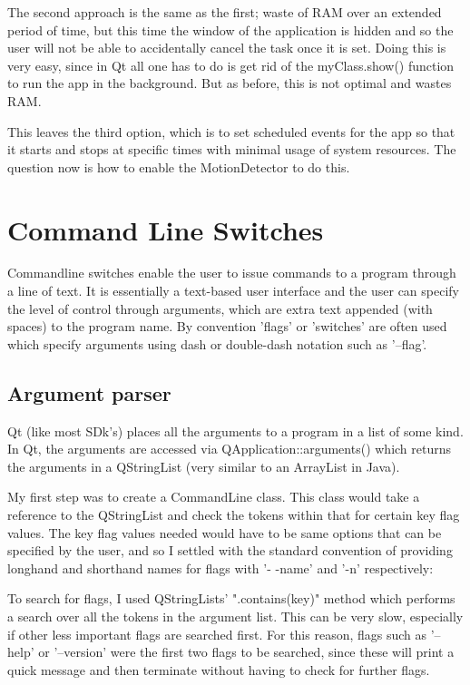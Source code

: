 The second approach is the same as the first; waste of RAM over an extended period of time, but this time the window of the application is hidden and so the user will not be able to accidentally cancel the task once it is set. Doing this is very easy, since in Qt all one has to do is get rid of the myClass.show() function to run the app in the background. But as before, this is not optimal and wastes RAM.

This leaves the third option, which is to set scheduled events for the app so that it starts and stops at specific times with minimal usage of system resources. The question now is how to enable the MotionDetector to do this.

\section{Command Line Switches}

Commandline switches enable the user to issue commands to a program through a line of text. It is essentially a text-based user interface and the user can specify the level of control through arguments, which are extra text appended (with spaces) to the program name. By convention 'flags' or 'switches' are often used which specify arguments using dash or double-dash notation such as '--flag'.

\subsection{Argument parser}

Qt (like most SDk's) places all the arguments to a program in a list of some kind. In Qt, the arguments are accessed via QApplication::arguments() which returns the arguments in a QStringList (very similar to an ArrayList in Java).

My first step was to create a CommandLine class. This class would take a reference to the QStringList and check the tokens within that for certain key flag values. The key flag values needed would have to be same options that can be specified by the user, and so I settled with the standard convention of providing longhand and shorthand names for flags with '- -name' and '-n' respectively:
\begin{frame}{}

\label{frame:help}
\end{frame}

To search for flags, I used QStringLists' ".contains(key)" method which performs a search over all the tokens in the argument list. This can be very slow, especially if other less important flags are searched first. 
For this reason, flags such as '--help' or '--version' were the first two flags to be searched, since these will print a quick message and then terminate without having to check for further flags.

